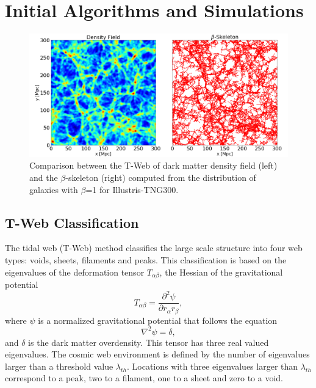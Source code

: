 \documentclass[usenatbib]{mnras}
\begin{document}
\section{Initial Algorithms and Simulations}\label{sec:init}

\begin{figure}
\centering
 \includegraphics[scale=0.3]{Figs/Fig1_.png}
 \caption{Comparison between the T-Web of dark matter density field (left) and the $\beta$-skeleton (right) computed from the distribution of galaxies with $\beta$=1 for Illustris-TNG300.}
 \label{fig:Fig1}
\end{figure}



\subsection{T-Web Classification}

The tidal web (T-Web) method \citep{2007Hahn,2009Forero-Romero} classifies the large scale
structure into four web types: voids, sheets, filaments and peaks. 
This classification is based on the eigenvalues of the deformation tensor $T_{\alpha\beta}$, the Hessian of the gravitational potential
\begin{equation}
T_{\alpha\beta}=\frac{\partial^2\psi}{\partial r_{\alpha}r_{\beta}},
\end{equation}
%
where $\psi$ is a normalized gravitational potential that follows the equation
\begin{equation}
    \nabla^2 \psi = \delta,
\end{equation}
%
and $\delta$ is the dark matter overdensity.
This tensor has three real valued eigenvalues. 
The cosmic web environment is defined by the number of eigenvalues larger than
a threshold value $\lambda_{th}$.
Locations with three eigenvalues larger than $\lambda_{th}$ correspond to a peak, two to a filament, one to a sheet and zero to a void.
\end{document}
